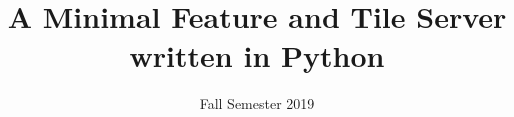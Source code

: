 \title  {A Minimal Feature and Tile Server written in Python}
\addresses  {\groupname\\\deptname\\\univname}
\date       {Fall Semester 2019}
\subject    {}
\keywords   {}


\maketitle
